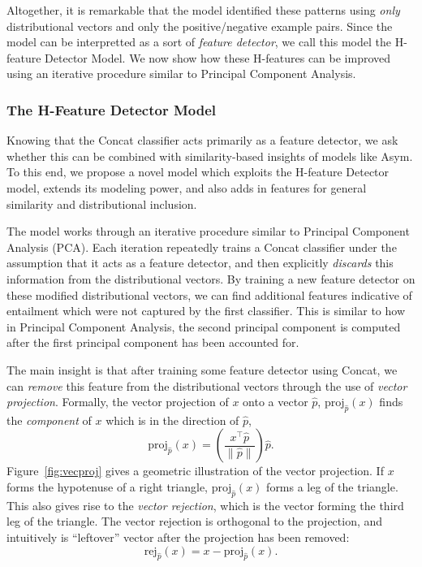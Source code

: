 \documentclass[12pt]{article}
\begin{document}
Altogether, it is remarkable that the model identified these patterns using
{\em only} distributional vectors and only the positive/negative example pairs.
Since the model can be interpretted as a sort of {\em feature detector}, we
call this model the H-feature Detector Model.
We now show how these H-features
can be improved using an iterative procedure similar to Principal Component
Analysis.

\subsubsection{The H-Feature Detector Model}

Knowing that the Concat classifier acts primarily as a feature detector, we ask
whether this can be combined with similarity-based insights of models like
Asym. To this end, we propose a novel model which exploits the H-feature
Detector model, extends its modeling power, and also adds in features for
general similarity and distributional inclusion.

The model works through an iterative procedure similar to Principal Component
Analysis (PCA). Each iteration repeatedly trains a Concat classifier under the
assumption that it acts as a feature detector, and then explicitly {\em discards}
this information from the distributional vectors. By training a new feature
detector on these modified distributional vectors, we can find additional
features indicative of entailment which were not captured by the first
classifier. This is similar to how in Principal Component Analysis, the
second principal component is computed after the first principal component
has been accounted for.

The main insight is that after training some feature detector using Concat,
we can {\em remove} this feature from the distributional vectors through
the use of {\em vector projection}.
Formally, the vector projection of $x$ onto
a vector $\hat p$, $\text{proj}_{\hat p}(x)$ finds the {\em component} of $x$
which is in the direction of $\hat p$,
\begin{equation*}
  \text{proj}_{\hat p}(x) = \left(\frac{x^\top\hat p}{\|\hat p\|}\right)\hat p.
\end{equation*}
Figure~\ref{fig:vecproj} gives a geometric illustration of the vector
projection. If $x$ forms the hypotenuse of a right
triangle, $\text{proj}_{\hat p}(x)$ forms a leg of the triangle. This also
gives rise to the {\em vector rejection}, which is the vector forming the third
leg of the triangle. The vector rejection is orthogonal to the projection, and
intuitively is ``leftover'' vector after the projection has been removed:
\begin{equation*}
  \text{rej}_{\hat p}(x) = x - \text{proj}_{\hat p}(x).
\end{equation*}
\end{document}

